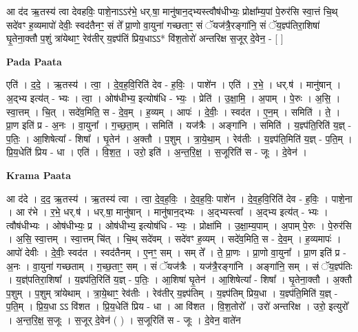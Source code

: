 \documentclass[17pt]{extarticle}
\begin{document}
आ द॑द ऋ॒तस्य॑ त्वा देवहविः॒ पाशे॒नाऽऽर॑भे॒ धर्.षा॒ मानु॑षान॒द्भ्यस्त्वौष॑धीभ्यः॒ प्रोक्षा᳚म्य॒पां पे॒रुर॑सि स्वा॒त्तं चि॒थ् सदे॑वꣳ ह॒व्यमापो॑ देवीः॒ स्वद॑तैनꣳ॒॒ सं ते᳚ प्रा॒णो वा॒युना॑ गच्छताꣳ॒॒ सं ॅयज॑त्रै॒रङ्गा॑नि॒ सं ॅय॒ज्ञ्प॑तिरा॒शिषा॑ घृ॒तेना॒क्तौ प॒शुं त्रा॑येथाꣳ॒॒ रेव॑तीर् य॒ज्ञ्प॑तिं प्रिय॒धाऽऽ* वि॑श॒तोरो॑ अन्तरिक्ष स॒जूर् दे॒वेन॒ - [ ] \newline

\textbf{Pada Paata} \newline

एति॑ । द॒दे॒ । ऋ॒तस्य॑ । त्वा॒ । दे॒व॒ह॒वि॒रिति॑ देव - ह॒विः॒ । पाशे॑न । एति॑ । र॒भे॒ । धर्.ष॑ । मानु॑षान् । अ॒द्भ्य इत्य॑त् - भ्यः । त्वा॒ । ओष॑धीभ्य॒ इत्योष॑धि - भ्यः॒ । प्रेति॑ । उ॒क्षा॒मि॒ । अ॒पाम् । पे॒रुः । अ॒सि॒ । स्वा॒त्तम् । चि॒त् । सदे॑व॒मिति॒ स - दे॒व॒म् । ह॒व्यम् । आपः॑ । दे॒वीः॒ । स्वद॑त । ए॒न॒म् । समिति॑ । ते॒ । प्रा॒ण इति॑ प्र - अ॒नः । वा॒युना᳚ । ग॒च्छ॒ता॒म् । समिति॑ । यज॑त्रैः । अङ्गा॑नि । समिति॑ । य॒ज्ञ्प॑ति॒रिति॑ य॒ज्ञ् - प॒तिः॒ । आ॒शिषेत्या᳚ - शिषा᳚ । घृ॒तेन॑ । अ॒क्तौ । प॒शुम् । त्रा॒ये॒था॒म् । रेव॑तीः । य॒ज्ञ्प॑ति॒मिति॑ य॒ज्ञ् - प॒ति॒म् । प्रि॒य॒धेति॑ प्रिय - धा । एति॑ । वि॒श॒त॒ । उरो॒ इति॑ । अ॒न्त॒रि॒क्ष॒ । स॒जूरिति॑ स - जूः । दे॒वेन॑ ।  \newline


\textbf{Krama Paata} \newline

आ द॑दे । द॒द॒ ऋ॒तस्य॑ । ऋ॒तस्य॑ त्वा । त्वा॒ दे॒व॒ह॒विः॒ । दे॒व॒ह॒विः॒ पाशे॑न । दे॒व॒ह॒वि॒रिति॑ देव - ह॒विः॒ । पाशे॒ना । आ र॑भे । र॒भे॒ धर्.ष॑ । धर्.षा॒ मानु॑षान् । मानु॑षान॒द्भ्यः । अ॒द्भ्यस्त्वा᳚ । अ॒द्भ्य इत्य॑त् - भ्यः । त्वौष॑धीभ्यः । ओष॑धीभ्यः॒ प्र । ओष॑धीभ्य॒ इत्योष॑धि - भ्यः॒ । प्रोक्षा॑मि । उ॒क्षा॒म्य॒पाम् । अ॒पाम् पे॒रुः । पे॒रुर॑सि । अ॒सि॒ स्वा॒त्तम् । स्वा॒त्तम् चि॑त् । चि॒थ् सदे॑वम् । सदे॑वꣳ ह॒व्यम् । सदे॑व॒मिति॒ स - दे॒व॒म् । ह॒व्यमापः॑ । आपो॑ देवीः । दे॒वीः॒ स्वद॑त । स्वद॑तैनम् । ए॒नꣳ॒॒ सम् । सम् ते᳚ । ते॒ प्रा॒णः । प्रा॒णो वा॒युना᳚ । प्रा॒ण इति॑ प्र - अ॒नः । वा॒युना॑ गच्छताम् । ग॒च्छ॒ताꣳ॒॒ सम् । सं ॅयज॑त्रैः । यज॑त्रै॒रङ्गा॑नि । अङ्गा॑नि॒ सम् । सं ॅय॒ज्ञ्प॑तिः । य॒ज्ञ्॑पतिरा॒शिषा᳚ । य॒ज्ञ्प॑ति॒रिति॑ य॒ज्ञ् - प॒तिः॒ । आ॒शिषा॑ घृ॒तेन॑ । आ॒शिषेत्या᳚ - शिषा᳚ । घृ॒तेना॒क्तौ । अ॒क्तौ प॒शुम् । प॒शुम् त्रा॑येथाम् । त्रा॒ये॒थाꣳ॒॒ रेव॑तीः । रेव॑तीर् य॒ज्ञ्प॑तिम् । य॒ज्ञ्प॑तिम् प्रिय॒धा । य॒ज्ञ्प॑ति॒मिति॑ य॒ज्ञ् - प॒ति॒म् । प्रि॒य॒धा ऽऽ वि॑शत । प्रि॒य॒धेति॑ प्रिय - धा । आ वि॑शत । वि॒श॒तोरो᳚ । उरो॑ अन्तरिक्ष । उरो॒ इत्युरो᳚ । अ॒न्त॒रि॒क्ष॒ स॒जूः । स॒जूर् दे॒वेन॑ ( ) । स॒जूरिति॑ स - जूः । दे॒वेन॒ वाते॑न \newline
\end{document}
